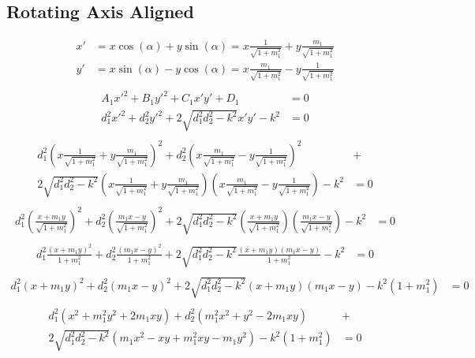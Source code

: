 \documentclass{article}
\begin{document}
\subsection{Rotating Axis Aligned}
\begin{align*}
  x' &= x \cos(\alpha) + y \sin(\alpha) = x \frac{1}{\sqrt{1+m_1^2}} + y \frac{m_1}{\sqrt{1+m_1^2}}\\
  y' &= x \sin(\alpha) - y \cos(\alpha) = x \frac{m_1}{\sqrt{1+m_1^2}} - y \frac{1}{\sqrt{1+m_1^2}}\\
\end{align*}
\begin{align*}
  A_1 x'^2 + B_1 y'^2 + C_1 x' y' + D_1 &= 0\\
  d_1^2 x'^2 + d_2^2 y'^2 + 2 \sqrt{d_1^2 d_2^2 - k^2} x' y' - k^2 &= 0\\
\end{align*}
\begin{align*}
  d_1^2 (x \frac{1}{\sqrt{1 + m_1^2}} + y \frac{m_1}{\sqrt{1 + m_1^2}})^2 +
  d_2^2 (x \frac{m_1}{\sqrt{1 + m_1^2}} - y \frac{1}{\sqrt{1 + m_1^2}})^2 &+\\
  2 \sqrt{d_1^2 d_2^2 - k^2} (x \frac{1}{\sqrt{1 + m_1^2}} + y \frac{m_1}{\sqrt{1 + m_1^2}}) (x \frac{m_1}{\sqrt{1 + m_1^2}} - y \frac{1}{\sqrt{1 + m_1^2}}) - k^2 &= 0\\
\end{align*}
\begin{align*}
  d_1^2 (\frac{x + m_1 y}{\sqrt{1+m_1^2}})^2 + d_2^2 (\frac{m_1 x - y}{\sqrt{1 + m_1^2}})^2 +
  2 \sqrt{d_1^2 d_2^2 - k^2} (\frac{x + m_1 y}{\sqrt{1 + m_1^2}}) (\frac{m_1 x - y}{\sqrt{1 + m_1^2}}) - k^2 &= 0\\
\end{align*}
\begin{align*}
  d_1^2 \frac{(x + m_1 y)^2}{1 + m_1^2} + d_2^2 \frac{(m_1 x - y)^2}{1 + m_1^2} +
  2 \sqrt{d_1^2 d_2^2 - k^2} \frac{(x + m_1 y)(m_1 x - y)}{1 + m_1^2} - k^2 &= 0\\
\end{align*}
\begin{align*}
  d_1^2 (x + m_1 y)^2 + d_2^2 (m_1 x - y)^2 +
  2 \sqrt{d_1^2 d_2^2 - k^2} (x + m_1 y)(m_1 x - y) - k^2 (1 + m_1^2) &= 0\\
\end{align*}
\begin{align*}
  d_1^2 (x^2 + m_1^2 y^2 + 2 m_1 x y) + d_2^2 (m_1^2 x^2 + y^2 - 2 m_1 x y) &+\\
  2 \sqrt{d_1^2 d_2^2 - k^2} (m_1 x^2 - x y + m_1^2 x y - m_1 y^2) - k^2 (1 + m_1^2) &= 0\\
\end{align*}
\end{document}
